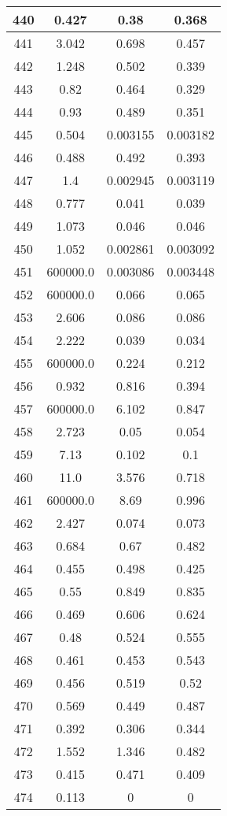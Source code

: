 \begin{table}[H]
\begin{tabular}{|c|c|c|c|}
\hline
440 & 0.427 & 0.38 & 0.368 \\
\hline
441 & 3.042 & 0.698 & 0.457 \\
\hline
442 & 1.248 & 0.502 & 0.339 \\
\hline
443 & 0.82 & 0.464 & 0.329 \\
\hline
444 & 0.93 & 0.489 & 0.351 \\
\hline
445 & 0.504 & 0.003155 & 0.003182 \\
\hline
446 & 0.488 & 0.492 & 0.393 \\
\hline
447 & 1.4 & 0.002945 & 0.003119 \\
\hline
448 & 0.777 & 0.041 & 0.039 \\
\hline
449 & 1.073 & 0.046 & 0.046 \\
\hline
450 & 1.052 & 0.002861 & 0.003092 \\
\hline
451 & 600000.0 & 0.003086 & 0.003448 \\
\hline
452 & 600000.0 & 0.066 & 0.065 \\
\hline
453 & 2.606 & 0.086 & 0.086 \\
\hline
454 & 2.222 & 0.039 & 0.034 \\
\hline
455 & 600000.0 & 0.224 & 0.212 \\
\hline
456 & 0.932 & 0.816 & 0.394 \\
\hline
457 & 600000.0 & 6.102 & 0.847 \\
\hline
458 & 2.723 & 0.05 & 0.054 \\
\hline
459 & 7.13 & 0.102 & 0.1 \\
\hline
460 & 11.0 & 3.576 & 0.718 \\
\hline
461 & 600000.0 & 8.69 & 0.996 \\
\hline
462 & 2.427 & 0.074 & 0.073 \\
\hline
463 & 0.684 & 0.67 & 0.482 \\
\hline
464 & 0.455 & 0.498 & 0.425 \\
\hline
465 & 0.55 & 0.849 & 0.835 \\
\hline
466 & 0.469 & 0.606 & 0.624 \\
\hline
467 & 0.48 & 0.524 & 0.555 \\
\hline
468 & 0.461 & 0.453 & 0.543 \\
\hline
469 & 0.456 & 0.519 & 0.52 \\
\hline
470 & 0.569 & 0.449 & 0.487 \\
\hline
471 & 0.392 & 0.306 & 0.344 \\
\hline
472 & 1.552 & 1.346 & 0.482 \\
\hline
473 & 0.415 & 0.471 & 0.409 \\
\hline
474 & 0.113 & 0 & 0 \\
\hline
\end{tabular}
\end{table}
